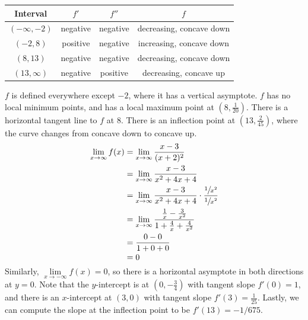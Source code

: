 \documentclass[10pt,oneside,]{book}
\theoremstyle{plain}
\theoremstyle{definition}
\numberwithin{equation}{section}
\newcommand{\fe}[2]{#1\mathopen{}\left(#2\right)\mathclose{}}
\newcommand{\ointerval}[2]{\left(#1,#2\right)}
\newcommand{\point}[2]{\left(#1,#2\right)}
\newcommand{\fd}[1]{#1'}
\newcommand{\sd}[1]{#1''}
\begin{document}
\begin{tabular}{cccc}
\toprule
Interval&\(\fd{f}\)&\(\sd{f}\)&\(f\)\\
\midrule
\(\ointerval{-\infty}{-2}\)&negative&negative&decreasing, concave down\\
\midrule
\(\ointerval{-2}{8}\)&positive&negative&increasing, concave down\\
\midrule
\(\ointerval{8}{13}\)&negative&negative&decreasing, concave down\\
\midrule
\(\ointerval{13}{\infty}\)&negative&positive&decreasing, concave up\\
\midrule
\end{tabular}
\par
\(f\) is defined everywhere except \(-2\), where it has a vertical asymptote. \(f\) has no local minimum points, and has a local maximum point at \(\point{8}{\frac{1}{20}}\). There is a horizontal tangent line to \(f\) at \(8\). There is an inflection point at \(\point{13}{\frac{2}{45}}\), where the curve changes from concave down to concave up. \begin{align*}
\lim_{x\to\infty}\fe{f}{x}&=\lim_{x\to\infty}\frac{x-3}{(x+2)^2}\\
&=\lim_{x\to\infty}\frac{x-3}{x^2+4x+4}\\
&=\lim_{x\to\infty}\frac{x-3}{x^2+4x+4}\cdot\frac{\sfrac{1}{x^2}}{\sfrac{1}{x^2}}\\
&=\lim_{x\to\infty}\frac{\frac{1}{x}-\frac{3}{x^2}}{1+\frac{4}{x}+\frac{4}{x^2}}\\
&=\frac{0-0}{1+0+0}\\
&=0
\end{align*}Similarly, \(\lim\limits_{x\to-\infty}\fe{f}{x}=0\), so there is a horizontal asymptote in both directions at \(y=0\). Note that the \(y\)-intercept is at \(\point{0}{-\frac{3}{4}}\) with tangent slope \(\fe{\fd{f}}{0}=1\), and there is an \(x\)-intercept at \(\point{3}{0}\) with tangent slope \(\fe{\fd{f}}{3}=\frac{1}{25}\). Lastly, we can compute the slope at the inflection point to be \(\fe{\fd{f}}{13}=-1/675\).%
{
}
\end{document}
